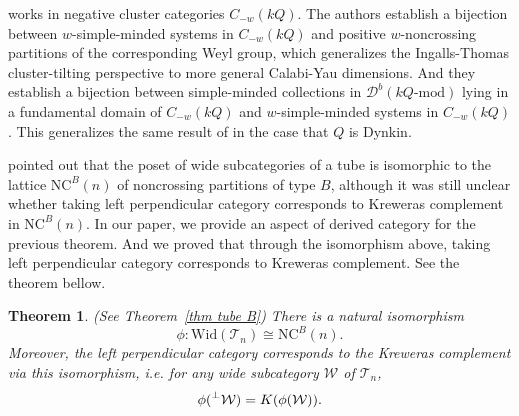\documentclass[a4paper, 11pt, reqno]{amsart}
\numberwithin{equation}{section}
\newtheorem{thm}{Theorem}[section]
\theoremstyle{remark}
\theoremstyle{definition}
\begin{document}
\cite{coelho2022functorially} works in negative cluster categories $C_{-w}(kQ)$. The authors establish a bijection between $w$-simple-minded systems in $C_{-w}(kQ)$ and positive $w$-noncrossing partitions of the corresponding Weyl group, which generalizes the Ingalls-Thomas cluster-tilting perspective to more general Calabi-Yau dimensions. And they establish a bijection between simple-minded collections in $\mathcal D^b(kQ \text{-} \mathrm{mod})$ lying in a fundamental domain of $C_{-w}(kQ)$ and $w$-simple-minded systems in $C_{-w}(kQ)$. This generalizes the same result of \cite{iyama2023positive} in the case that $Q$ is Dynkin.

\cite[Corollary 9.2(2)]{krause2021category} pointed out that the poset of wide subcategories of a tube is isomorphic to the lattice $\mathrm{NC}^B(n)$ of noncrossing partitions of type $B$, although it was still unclear whether taking left perpendicular category corresponds to Kreweras complement in $\mathrm{NC}^B(n)$. In our paper, we provide an aspect of derived category for the previous theorem. And we proved that through the isomorphism above, taking left perpendicular category corresponds to Kreweras complement. See the theorem bellow.

\begin{thm} \label{thm 1} (See Theorem~\ref{thm tube B})
   There is a natural isomorphism
   \[
   \phi: \mathrm{Wid}(\mathcal T_n) \cong \mathrm{NC}^B(n).
   \]
   Moreover, the left perpendicular category corresponds to the Kreweras complement via this isomorphism, i.e. for any wide subcategory $\mathcal W$ of $\mathcal T_n$,
   \[
   \phi(\prescript{\perp}{}{\mathcal W})=K(\phi(\mathcal W)).
   \]
\end{thm}
\end{document}
